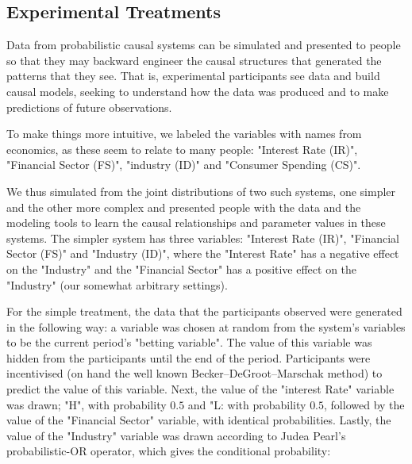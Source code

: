 \subsection{Experimental Treatments}

Data from probabilistic causal systems can be simulated and presented to people so that they may backward engineer the causal structures that generated the patterns that they see. That is, experimental participants see data and build causal models, seeking to understand how the data was produced and to make predictions of future observations. 

To make things more intuitive, we labeled the variables with names from economics, as these seem to relate to many people: "Interest Rate (IR)", "Financial Sector (FS)", "industry (ID)" and "Consumer Spending (CS)". 


We thus simulated from the joint distributions of two such systems, one simpler and the other more complex and presented people with the data and the modeling tools to learn the causal relationships and parameter values in these systems. The simpler system has three variables: "Interest Rate (IR)", "Financial Sector (FS)" and "Industry (ID)", where the "Interest Rate" has a negative effect on the "Industry" and the "Financial Sector" has a positive effect on the "Industry" (our somewhat arbitrary settings).

For the simple treatment, the data that the participants observed were generated in the following way: a variable was chosen at random from the system's variables to be the current period's "betting variable". The value of this variable was hidden from the participants until the end of the period. Participants were incentivised (on hand the well known Becker–DeGroot–Marschak method) to predict the value of this variable. Next, the value of the "interest Rate" variable was drawn; "H", with probability $0.5$ and "L: with probability $0.5$, followed by the value of the "Financial Sector" variable, with identical probabilities. Lastly, the value of the "Industry" variable was drawn according to Judea Pearl's \citep{Pearl88} probabilistic-OR operator, which gives the conditional probability:  

